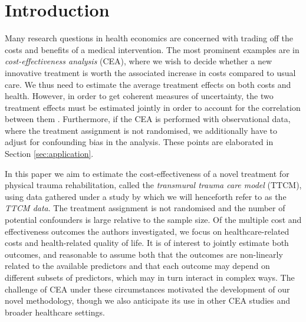\documentclass[aoas,preprint]{imsart}
\theoremstyle{plain}
\theoremstyle{definition}
\theoremstyle{remark}
\begin{document}
\section{Introduction}
Many research questions in health economics are concerned with trading off the costs and benefits of a medical intervention. The most prominent examples are in \textit{cost-effectiveness analysis} (CEA), where we wish to decide whether a new innovative treatment is worth the associated increase in costs compared to usual care. We thus need to estimate the average treatment effects on both costs and health. However, in order to get coherent measures of uncertainty, the two treatment effects must be estimated jointly in order to account for the correlation between them \citep{baio2012bayesian}. Furthermore, if the CEA is performed with observational data, where the treatment assignment is not randomised, we additionally have to adjust for confounding bias in the analysis. These points are elaborated in Section \ref{sec:application}.

In this paper we aim to estimate the cost-effectiveness of a novel treatment for physical trauma rehabilitation, called the \textit{transmural trauma care model} (TTCM), using data gathered under a study by \citet{wiertsema2019cost} which we will henceforth refer to as the \textit{TTCM data}. The treatment assignment is not randomised and the number of potential confounders is large relative to the sample size. Of the multiple cost and effectiveness outcomes the authors investigated, we focus on healthcare-related costs and health-related quality of life. It is of interest to jointly estimate both outcomes, and reasonable to assume both that the outcomes are non-linearly related to the available predictors and that each outcome may depend on different subsets of predictors, which may in turn interact in complex ways. The challenge of CEA under these circumstances motivated the development of our novel methodology, though we also anticipate its use in other CEA studies and broader healthcare settings.
\end{document}
